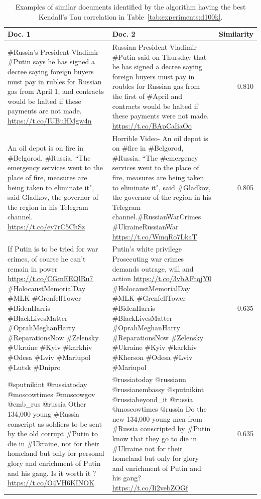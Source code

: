 \documentclass[runningheads]{llncs}
\begin{document}
\begin{table}
  \caption{Examples of similar documents identified by the algorithm having the best Kendall's Tau correlation in Table~\ref{tab:experiments:d100k}.}
  \label{tab:experiments:examples}
  \centering
  \begin{tabular}{p{}@{\hspace{0.5cm}}p{}@{\hspace{0.5cm}}r}
    \toprule
     Doc. 1 & Doc. 2 & Similarity \\
    \midrule
    \#Russia’s President Vladimir \#Putin says he has signed a decree saying foreign buyers must pay in rubles for Russian gas from April 1, and contracts would be halted if these payments are not made. \url{https://t.co/IUBuHMgw4n} & Russian President Vladimir \#Putin said on Thursday that he has signed a decree saying foreign buyers must pay in roubles for Russian gas from the first of \#April and contracts would be halted if these payments were not made. \url{https://t.co/BApCaIiaOo} & 0.810 \\
    \hline
    An oil depot is on fire in \#Belgorod, \#Russia. “The emergency services went to the place of fire, measures are being taken to eliminate it", said Gladkov, the governor of the region in his Telegram channel. \url{https://t.co/ey7rC5ChSz} & Horrible Video- An oil depot is on \#fire in \#Belgorod, \#Russia. “The \#emergency services went to the place of fire, measures are being taken to eliminate it", said \#Gladkov, the governor of the region in his Telegram channel.\#RussianWarCrimes \#UkraineRussianWar \url{https://t.co/WmqRo7LkaT} & 0.805 \\
    \hline
    If Putin is to be tried for war crimes, of course he can’t remain in power \url{https://t.co/CGmEEQlRu7} \#HolocaustMemorialDay \#MLK \#GrenfellTower \#BidenHarris \#BlackLivesMatter  \#OprahMeghanHarry \#ReparationsNow \#Zelensky \#Ukraine \#Kyiv \#karkhiv \#Odesa \#Lviv \#Mariupol \#Lutsk \#Dnipro & Putin's white privilege Prosecuting war crimes demands outrage, will and action \url{https://t.co/3vbAFtqjY0} \#HolocaustMemorialDay \#MLK \#GrenfellTower \#BidenHarris \#BlackLivesMatter  \#OprahMeghanHarry \#ReparationsNow \#Zelensky \#Ukraine \#Kyiv \#karkhiv \#Kherson \#Odesa \#Lviv \#Mariupol & 0.635\\
    \hline
    @sputnikint @russiatoday @moscowtimes @moscowgov @emb\_rus @russia Other 134,000 young \#Russia conscript as soldiers to be sent by the old corrupt \#Putin to die in \#Ukraine, not for their homeland but only for  personal glory and enrichment of Putin and his gang. Is it worth it ? \url{https://t.co/O4VH6KINOK} & @russiatoday @russiaun @russianembassy @sputnikint @russiabeyond\_it @russia @moscowtimes @russia Do the new 134,000 young men from \#Russia conscripted by \#Putin know that they go to die in \#Ukraine not for their homeland but only for glory and enrichment of Putin and his gang? \url{https://t.co/Ii2vebZOGf} & 0.635\\
    \bottomrule
  \end{tabular}
\end{table}
\end{document}
